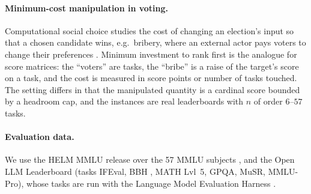 \paragraph{Minimum-cost manipulation in voting.}
Computational social choice studies the cost of changing an election's input so that a chosen candidate wins,
e.g.\ bribery, where an external actor pays voters to change their preferences \citep{faliszewski2009bribery}.
Minimum investment to rank first is the analogue for score matrices: the ``voters'' are tasks, the ``bribe'' is a raise of the target's score on a task,
and the cost is measured in score points or number of tasks touched. The setting differs in that the manipulated quantity is a cardinal score
bounded by a headroom cap, and the instances are real leaderboards with $n$ of order $6$--$57$ tasks.

\paragraph{Evaluation data.}
We use the HELM MMLU release \citep{liang2022holistic} over the 57 MMLU subjects \citep{hendrycks2021measuring},
and the Open LLM Leaderboard (tasks IFEval, BBH \citep{suzgun2023challenging}, MATH Lvl~5, GPQA, MuSR, MMLU-Pro), whose tasks are run with the Language Model Evaluation Harness \citep{gao2023harness}.
